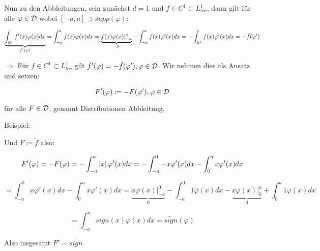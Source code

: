 Nun zu den Abbleitungen, sein zunächst $d=1$ und $f \in C^1 \subset L^1_{loc}$, dann gilt für alle $\varphi \in \mathcal{D}$ wobei $[-a,a] \supset supp(\varphi)$:

\[\underbrace{\int_{\mathbb R^1} f'(x) \varphi(x) dx}_{f'(\varphi)} = \int_{-a}^a f(x) \varphi(x) dx = \underbrace{f(x)\varphi(x)|_{-a}^{a}}_{=0} - \int_{-a}^a f(x) \varphi'(x) dx = -\int_{\mathbb R^1} f(x) \varphi'(x) dx = -\tilde f(\varphi')\]

$\Rightarrow$ Für $f \in C^1 \subset L^1_{loc}$ gilt $\tilde f'(\varphi) = - \tilde f(\varphi'), \varphi \in \mathcal{D}$. Wir nehmen dies als Ansatz und setzen:

\begin{equation}\label{eq.11.2}
    F'(\varphi) \coloneqq -F(\varphi'), \varphi \in \mathcal{D}
\end{equation}

für alle $F\in \mathcal{D}$, genannt Distributionen Abbleitung.

Beispiel:

\begin{center}
\end{center}
Und $F \coloneqq \tilde f$ also:

\[F'(\varphi) = -F(\varphi) = - \int_{-a}^a \left| x \right| \varphi'(x) dx = - \int_{-a}^0 -x \varphi'(x) dx - \int_0^a x \varphi'(x) dx \]

\[= \int_{-a}^0 x \varphi'(x) dx - \int_0^a x \varphi'(x) dx = \underbrace{x \varphi(x)|_{-a}^0}_{0} - \int_{-a}^0 1 \varphi(x) dx - \underbrace{x \varphi(x)|_0^a}_{0} + \int_0^a 1 \varphi(x) dx\]

\[= \int_{-a}^a sign(x) \varphi(x) dx = \tilde{sign}(\varphi)\]

\begin{center}
\end{center}

Also insgesamt $F'=\tilde{sign}$

